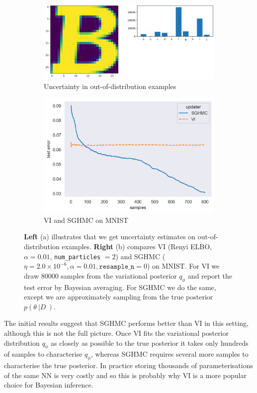 \begin{figure}[h!]
\centering
\begin{subfigure}{.5\textwidth}
  \centering
  \includegraphics[width=.95\linewidth]{parts/Images/B.png}
  \caption{Uncertainty in out-of-distribution examples}
  \label{fig:B}
\end{subfigure}%
\begin{subfigure}{.5\textwidth}
  \centering
  \includegraphics[width=.95\linewidth]{parts/Images/VI_SGHMC.png}
  \caption{VI and SGHMC on MNIST}
  \label{fig:VI}
\end{subfigure}
\caption{{\bf Left} (a) illustrates that we get uncertainty estimates on out-of-distribution examples. {\bf Right} (b) compares VI (Renyi ELBO, $\alpha = 0.01$, \texttt{num\_particles} $= 2$) and SGHMC ($\eta = 2.0\times 10^{-6}, \alpha=0.01, \texttt{resample\_n} =0$) on MNIST. For VI we draw 80000 samples from the variational posterior $q_{\phi}$ and report the test error by Bayesian averaging. For SGHMC we do the same, except we are approximately sampling from the true posterior $p(\theta \: | D \:)$.}
\label{fig:demo}
\end{figure}
The initial results suggest that SGHMC performs better than VI in this setting, although this is not the full picture. Once VI fits the variational posterior distribution $q_{\phi}$ as closely as possible to the true posterior it takes only hundreds of samples to characterise $q_{\phi}$, whereas SGHMC requires several more samples to characterise the true posterior. In practice storing thousands of parameterisations of the same NN is very costly and so this is probably why VI is a more popular choice for Bayesian inference. 

